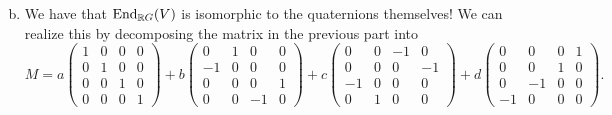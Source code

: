 \documentclass[leqno]{article}
\begin{document}
\begin{solution}
\begin{enumerate}[(a)]
\[    \]
    \item We have that $\mathrm{End}_{\mathbb{R} G}(V)$ is isomorphic to the quaternions themselves! We can realize this by decomposing the matrix in the previous part into
    \[
    M= a \begin{pmatrix} 1 & 0 & 0 & 0 \\ 0 & 1 & 0 & 0\\ 0 & 0 & 1 & 0\\ 0 & 0 & 0 & 1\end{pmatrix} + b\begin{pmatrix} 0 & 1 & 0 & 0\\ -1 & 0 & 0 & 0 \\ 0 & 0 & 0 & 1\\ 0 & 0 & -1 & 0\end{pmatrix} + c \begin{pmatrix} 0 & 0 & -1 & 0\\ 0 & 0 & 0 & -1 \\ -1 & 0 & 0 & 0\\ 0 & 1 & 0 & 0 \end{pmatrix} +d\begin{pmatrix} 0 & 0 & 0 & 1 \\ 0 & 0 & 1 & 0\\ 0 & -1 & 0 & 0\\ -1 & 0 & 0 & 0\end{pmatrix}.
    \]
\end{enumerate}
\end{solution}
\end{document}
